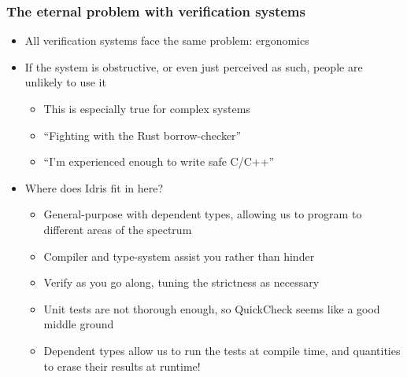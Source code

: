\documentclass[compress,handout]{beamer}
\begin{document}
\begin{frame}
  \frametitle{The eternal problem with verification systems}

  \begin{itemize}
    \item<1-> All verification systems face the same problem: ergonomics
    \item<2-> If the system is obstructive, or even just perceived as such,
              people are unlikely to use it
    \begin{itemize}
      \item<3-> This is especially true for complex systems
      \item<4-> ``Fighting with the Rust borrow-checker''
      \item<5-> ``I'm experienced enough to write safe C/C++''
    \end{itemize}
    \item<6-> Where does Idris fit in here?
      \begin{itemize}
        \item<7-> General-purpose with dependent types, allowing us to program
                  to different areas of the spectrum
        \item<8-> Compiler and type-system assist you rather than hinder
        \item<9-> Verify as you go along, tuning the strictness as necessary
        \item<10-> Unit tests are not thorough enough, so QuickCheck seems like
                   a good middle ground
        \item<11-> Dependent types allow us to run the tests at compile time,
                   and quantities to erase their results at runtime!
      \end{itemize}
  \end{itemize}

  \vspace*{-5mm}

\end{frame}
\end{document}
